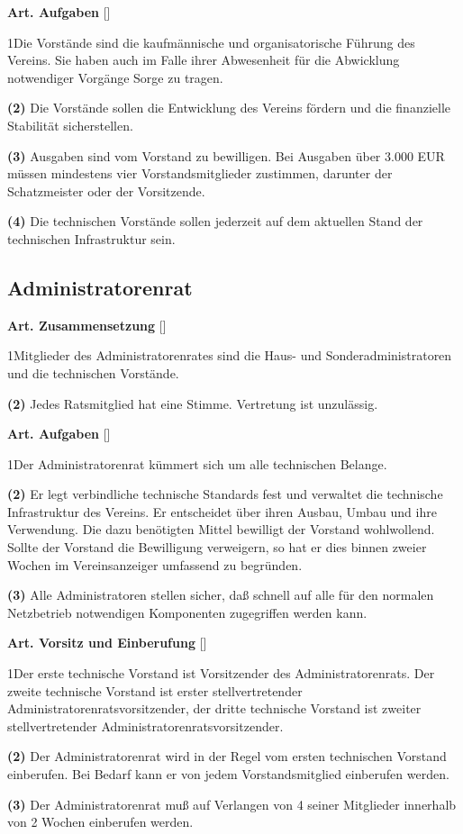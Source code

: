 \documentclass[12pt]{article}
\newcommand{\UAbschnitt}[1]{\subsection{#1}}
\newcommand{\Satz}[2]{

\begin{samepage}
{\bf (#1)} #2
\end{samepage}
}
\newenvironment{Artikel}[2]{
\bigskip \centerline{{\bf Art. #1} [#2]}
\nopagebreak
}{
}
\begin{document}
\begin{Artikel}{24}{Aufgaben}

\Satz{1}{Die Vorstände sind die kaufmännische und organisatorische Führung des Vereins.
  Sie haben auch im Falle ihrer Abwesenheit für die Abwicklung notwendiger Vorgänge Sorge zu tragen.}

\Satz{2}{Die Vorstände sollen die Entwicklung des Vereins fördern und die finanzielle Stabilität sicherstellen.}

\Satz{3}{Ausgaben sind vom Vorstand zu bewilligen.
  Bei Ausgaben über 3.000 EUR müssen mindestens vier Vorstandsmitglieder zustimmen, darunter der Schatzmeister oder der Vorsitzende.}

\Satz{4}{Die technischen Vorstände sollen jederzeit auf dem aktuellen Stand der technischen Infrastruktur sein.}

\end{Artikel}

\UAbschnitt{Administratorenrat}

\begin{Artikel}{25}{Zusammensetzung}

\Satz{1}{Mitglieder des Administratorenrates sind die Haus- und Sonderadministratoren und die technischen Vorstände.}

\Satz{2}{Jedes Ratsmitglied hat eine Stimme. Vertretung ist unzulässig.}

\end{Artikel}

\begin{Artikel}{26}{Aufgaben}

\Satz{1}{Der Administratorenrat kümmert sich um alle technischen Belange.}

\Satz{2}{Er legt verbindliche technische Standards fest und verwaltet die technische Infrastruktur des Vereins.
  Er entscheidet über ihren Ausbau, Umbau und ihre Verwendung.
  Die dazu benötigten Mittel bewilligt der Vorstand wohlwollend.
  Sollte der Vorstand die Bewilligung verweigern, so hat er dies binnen zweier Wochen im Vereinsanzeiger umfassend zu begründen.}

\Satz{3}{Alle Administratoren stellen sicher, daß schnell auf alle für den normalen Netzbetrieb notwendigen Komponenten zugegriffen werden kann.}

\end{Artikel}

\begin{Artikel}{27}{Vorsitz und Einberufung}

\Satz{1}{Der erste technische Vorstand ist Vorsitzender des Administratorenrats.
  Der zweite technische Vorstand ist erster stellvertretender Administratorenratsvorsitzender, der dritte technische Vorstand ist zweiter stellvertretender Administratorenratsvorsitzender.}

\Satz{2}{Der Administratorenrat wird in der Regel vom ersten technischen Vorstand einberufen. Bei Bedarf kann er von jedem Vorstandsmitglied einberufen werden.}

\Satz{3}{Der Administratorenrat muß auf Verlangen von 4 seiner Mitglieder innerhalb von 2 Wochen einberufen werden.}

\end{Artikel}
\end{document}
